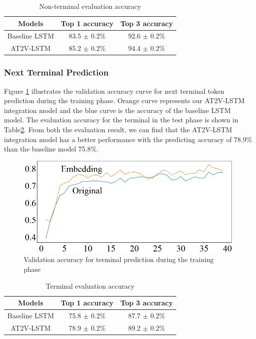 \documentclass[E]{compsoft}
\begin{document}
\begin{table}
\centering
\begin{tabular}{ccc}
\hline
Models& Top 1 accuracy& Top 3 accuracy\\
\hline
Baseline LSTM& 83.5 $\pm$ 0.2\% & 92.6 $\pm$ 0.2\% \\
AT2V-LSTM& 85.2 $\pm$ 0.2\% & 94.4 $\pm$ 0.2\% \\
\hline
\end{tabular}
\caption{Non-terminal evaluation accuracy}
\label{table:non-terminal-evalution-accuracy}
\end{table}



\subsubsection{Next Terminal Prediction} 
Figure \ref{fig:valid_accuracy_for_terminal} illustrates the validation accuracy curve for next terminal token prediction during the training phase. 
Orange curve represents our AT2V-LSTM integration model and the blue curve is the accuracy of the baseline LSTM model. 
The evaluation accuracy for the terminal in the test phase is shown in Table\ref{table:terminal-evalution-accuracy}. 
From both the evaluation result, we can find that the AT2V-LSTM integration model has a better performance with the predicting accuracy of 78.9\% than the baseline model 75.8\%. 


\begin{figure}[!ht]
\centering
\includegraphics[width=\columnwidth]{pictures/tt_valid_accuracy_v3.png}
\caption{Validation accuracy for terminal prediction during the training phase}
\label{fig:valid_accuracy_for_terminal}
\end{figure}


\begin{table}
\centering
\begin{tabular}{ccc}
\hline
Models& Top 1 accuracy& Top 3 accuracy\\
\hline
Baseline LSTM& 75.8 $\pm$ 0.2\% & 87.7 $\pm$ 0.2\% \\
AT2V-LSTM& 78.9 $\pm$ 0.2\% & 89.2 $\pm$ 0.2\% \\
\hline
\end{tabular}
\caption{Terminal evaluation accuracy}
\label{table:terminal-evalution-accuracy}
\end{table}
\end{document}
